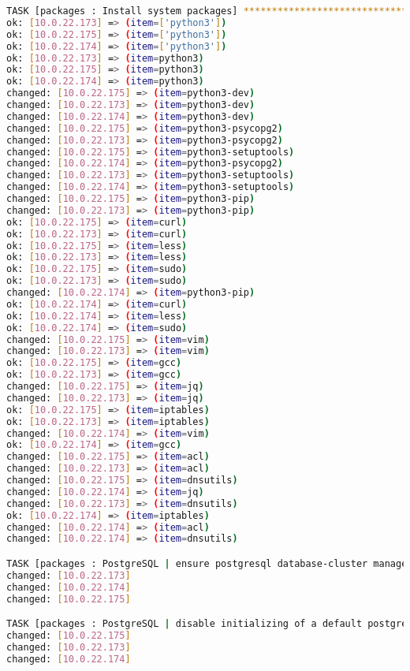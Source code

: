 \begin{flushleft}
\begin{lstlisting}[language=bash, caption=Deploy - Anhang - Deployt,captionpos=b,label={lst:deploy-appendix-deployt},breaklines=true]
TASK [packages : Install system packages] *************************************************************************************************************************************************************************
ok: [10.0.22.173] => (item=['python3'])
ok: [10.0.22.175] => (item=['python3'])
ok: [10.0.22.174] => (item=['python3'])
ok: [10.0.22.173] => (item=python3)
ok: [10.0.22.175] => (item=python3)
ok: [10.0.22.174] => (item=python3)
changed: [10.0.22.175] => (item=python3-dev)
changed: [10.0.22.173] => (item=python3-dev)
changed: [10.0.22.174] => (item=python3-dev)
changed: [10.0.22.175] => (item=python3-psycopg2)
changed: [10.0.22.173] => (item=python3-psycopg2)
changed: [10.0.22.175] => (item=python3-setuptools)
changed: [10.0.22.174] => (item=python3-psycopg2)
changed: [10.0.22.173] => (item=python3-setuptools)
changed: [10.0.22.174] => (item=python3-setuptools)
changed: [10.0.22.175] => (item=python3-pip)
changed: [10.0.22.173] => (item=python3-pip)
ok: [10.0.22.175] => (item=curl)
ok: [10.0.22.173] => (item=curl)
ok: [10.0.22.175] => (item=less)
ok: [10.0.22.173] => (item=less)
ok: [10.0.22.175] => (item=sudo)
ok: [10.0.22.173] => (item=sudo)
changed: [10.0.22.174] => (item=python3-pip)
ok: [10.0.22.174] => (item=curl)
ok: [10.0.22.174] => (item=less)
ok: [10.0.22.174] => (item=sudo)
changed: [10.0.22.175] => (item=vim)
changed: [10.0.22.173] => (item=vim)
ok: [10.0.22.175] => (item=gcc)
ok: [10.0.22.173] => (item=gcc)
changed: [10.0.22.175] => (item=jq)
changed: [10.0.22.173] => (item=jq)
ok: [10.0.22.175] => (item=iptables)
ok: [10.0.22.173] => (item=iptables)
changed: [10.0.22.174] => (item=vim)
ok: [10.0.22.174] => (item=gcc)
changed: [10.0.22.175] => (item=acl)
changed: [10.0.22.173] => (item=acl)
changed: [10.0.22.175] => (item=dnsutils)
changed: [10.0.22.174] => (item=jq)
changed: [10.0.22.173] => (item=dnsutils)
ok: [10.0.22.174] => (item=iptables)
changed: [10.0.22.174] => (item=acl)
changed: [10.0.22.174] => (item=dnsutils)

TASK [packages : PostgreSQL | ensure postgresql database-cluster manager package] *********************************************************************************************************************************
changed: [10.0.22.173]
changed: [10.0.22.174]
changed: [10.0.22.175]

TASK [packages : PostgreSQL | disable initializing of a default postgresql cluster] *******************************************************************************************************************************
changed: [10.0.22.175]
changed: [10.0.22.173]
changed: [10.0.22.174]


\end{lstlisting}
\end{flushleft}
